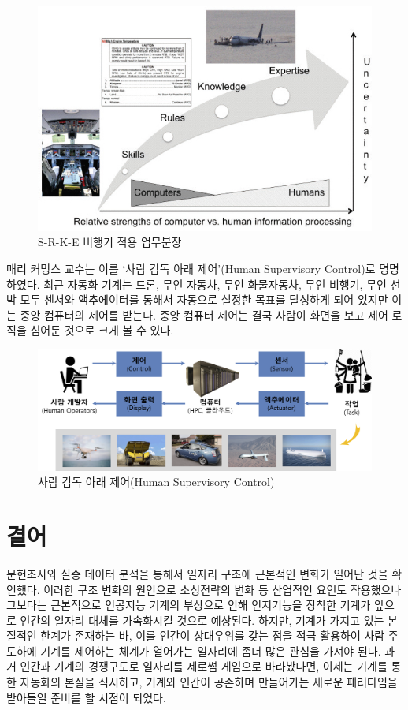 \documentclass[smallextended]{svjour3}       %
\begin{document}
\begin{figure}

{\centering \includegraphics[width=0.77\linewidth]{fig/role-allocation-skill-rules-experties} 

}

\caption{S-R-K-E 비행기 적용 업무분장}\label{fig:unnamed-chunk-5}
\end{figure}

매리 커밍스 교수는 이를 `사람 감독 아래 제어'(Human Supervisory
Control)로 명명하였다. 최근 자동화 기계는 드론, 무인 자동차, 무인
화물자동차, 무인 비행기, 무인 선박 모두 센서와 액추에이터를 통해서
자동으로 설정한 목표를 달성하게 되어 있지만 이는 중앙 컴퓨터의 제어를
받는다. 중앙 컴퓨터 제어는 결국 사람이 화면을 보고 제어 로직을 심어둔
것으로 크게 볼 수 있다.

\begin{figure}

{\centering \includegraphics[width=0.77\linewidth]{fig/human-supervisory-control} 

}

\caption{사람 감독 아래 제어(Human Supervisory Control)}\label{fig:unnamed-chunk-6}
\end{figure}

\hypertarget{conclusion}{%
\section{결어}\label{conclusion}}

문헌조사와 실증 데이터 분석을 통해서 일자리 구조에 근본적인 변화가
일어난 것을 확인했다. 이러한 구조 변화의 원인으로 소싱전략의 변화 등
산업적인 요인도 작용했으나 그보다는 근본적으로 인공지능 기계의 부상으로
인해 인지기능을 장착한 기계가 앞으로 인간의 일자리 대체를 가속화시킬
것으로 예상된다. 하지만, 기계가 가지고 있는 본질적인 한계가 존재하는 바,
이를 인간이 상대우위를 갖는 점을 적극 활용하여 사람 주도하에 기계를
제어하는 체계가 열어가는 일자리에 좀더 많은 관심을 가져야 된다. 과거
인간과 기계의 경쟁구도로 일자리를 제로썸 게임으로 바라봤다면, 이제는
기계를 통한 자동화의 본질을 직시하고, 기계와 인간이 공존하며 만들어가는
새로운 패러다임을 받아들일 준비를 할 시점이 되었다.



\end{document}
